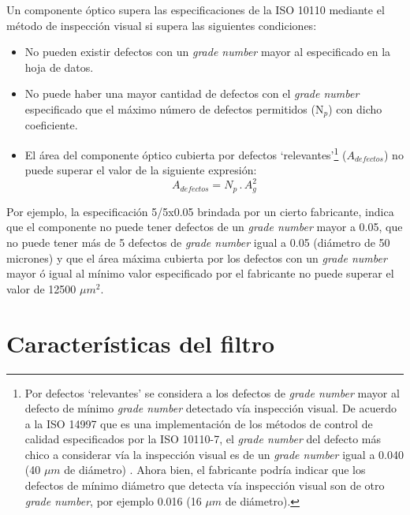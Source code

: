 Un componente óptico supera las especificaciones de la ISO 10110 mediante el método de inspección visual si supera las siguientes condiciones:
\begin{itemize}
\item No pueden existir defectos con un \textit{grade number} mayor al especificado en la hoja de datos.
\item No puede haber una mayor cantidad de defectos con el \textit{grade number} especificado que el máximo número de defectos permitidos (N$_{p}$) con dicho coeficiente.
\item El área del componente óptico cubierta por defectos `relevantes'\footnote{Por defectos `relevantes' se considera a los defectos de \textit{grade number} mayor al defecto de mínimo \textit{grade number} detectado vía inspección visual. De acuerdo a la ISO 14997 que es una implementación de los métodos de control de calidad especificados por la ISO 10110-7, el \textit{grade number} del defecto más chico a considerar vía la inspección visual es de un \textit{grade number} igual a 0.040 (40 $\mu m$ de diámetro) \cite{etsol}. Ahora bien, el fabricante podría indicar que los defectos de mínimo diámetro que detecta vía inspección visual son de otro \textit{grade number}, por ejemplo 0.016 (16 $\mu m$ de diámetro).} ($A_{defectos}$) no puede superar el valor de la siguiente expresión:
\begin{equation}
A_{defectos} = N_{p}\hspace{2pt} .\hspace{2pt} A_{g}^{2}
\label{eq:isoarea}
\end{equation}
\end{itemize}
\hspace{0.5cm}Por ejemplo, la especificación 5/5x0.05 brindada por un cierto fabricante, indica que el componente no puede tener defectos de un \textit{grade number} mayor a 0.05, que no puede tener más de 5 defectos de \textit{grade number} igual a 0.05 (diámetro de 50 micrones) y que el área máxima cubierta por los defectos con un \textit{grade number} mayor ó igual al mínimo valor especificado por el fabricante no puede superar el valor de 12500 $\mu m^{2}$.
 
\singlespacing
\section{Características del filtro}
\label{sec:carfilt}

